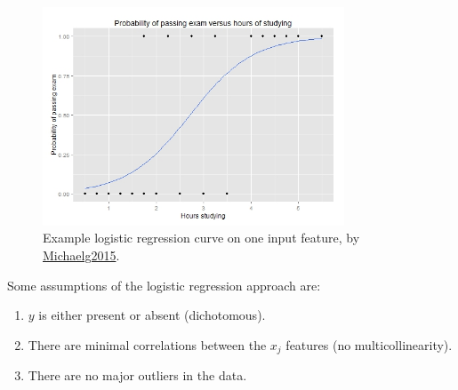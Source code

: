 \begin{figure}
\centering
\includegraphics[width=0.8\textwidth]{figures/regression/Exam_pass_logistic_curve.jpeg}
\caption{
Example logistic regression curve on one input feature, by \href{https://en.wikipedia.org/wiki/File:Exam_pass_logistic_curve.jpeg}{Michaelg2015}.
}
\label{fig:logistic_regression_ex}
\end{figure}

Some assumptions of the logistic regression approach are:
\begin{enumerate}[noitemsep]
\item $y$ is either present or absent (dichotomous).
\item There are minimal correlations between the $x_{j}$ features (no multicollinearity).
\item There are no major outliers in the data.
\end{enumerate}




